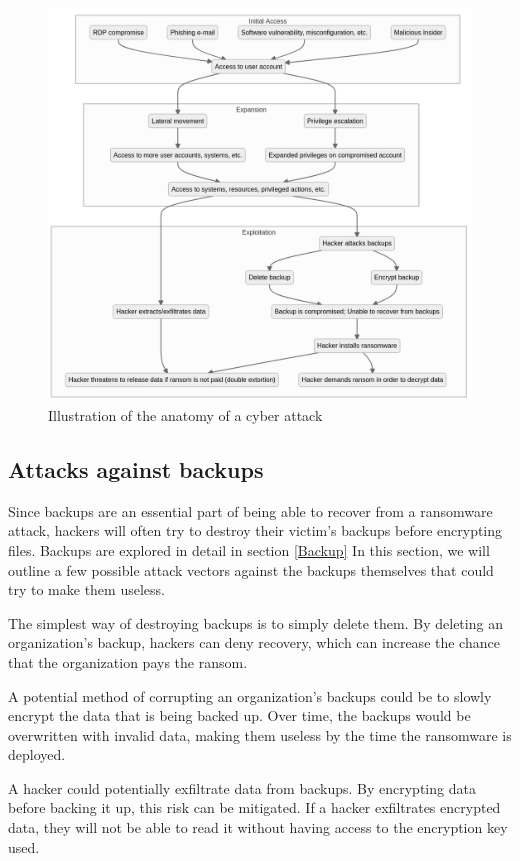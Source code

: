 \begin{figure}[h!]
    \centering
    \includegraphics[width=.9\linewidth]{figures/attack_anatomy.png}
    \caption{Illustration of the anatomy of a cyber attack}
    \label{fig:attack_anatomy}
\end{figure}

\subsection{Attacks against backups}

Since \gls{backup}s are an essential part of being able to recover from a ransomware attack,
hackers will often try to destroy their victim's backups before encrypting files. Backups are explored in detail in section \ref{Backup}
In this section, we will outline a few possible attack vectors 
against the backups themselves that could try to make them useless.

The simplest way of destroying backups is to simply delete them.
By deleting an organization's backup, hackers can deny recovery, 
which can increase the chance that the organization pays the ransom.

A potential method of corrupting an organization's backups could be to slowly encrypt
the data that is being backed up.
Over time, the backups would be overwritten with invalid data,
making them useless by the time the ransomware is deployed.

A hacker could potentially exfiltrate data from backups.
By encrypting data before backing it up, this risk can be mitigated.
If a hacker exfiltrates encrypted data,
they will not be able to read it without having access to the encryption key used.
    
